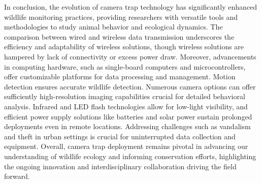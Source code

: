 \documentclass[class=report,11pt,crop=false]{standalone}
\begin{document}
In conclusion, the evolution of camera trap technology has significantly enhanced wildlife monitoring practices, providing researchers with versatile tools and methodologies to study animal behavior and ecological dynamics. The comparison between wired and wireless data transmission underscores the efficiency and adaptability of wireless solutions, though wireless solutions are hampered by lack of connectivity or excess power draw. Moreover, advancements in computing hardware, such as single-board computers and microcontrollers, offer customizable platforms for data processing and management. Motion detection ensures accurate wildlife detection. Numerous camera options can offer sufficiently high-resolution imaging capabilities crucial for detailed behavioral analysis. Infrared and LED flash technologies allow for low-light visibility, and efficient power supply solutions like batteries and solar power sustain prolonged deployments even in remote locations. Addressing challenges such as vandalism and theft in urban settings is crucial for uninterrupted data collection and equipment. Overall, camera trap deployment remains pivotal in advancing our understanding of wildlife ecology and informing conservation efforts, highlighting the ongoing innovation and interdisciplinary collaboration driving the field forward.

\ifstandalone

\printnoidxglossary[type=\acronymtype,nonumberlist]
\fi
\end{document}
